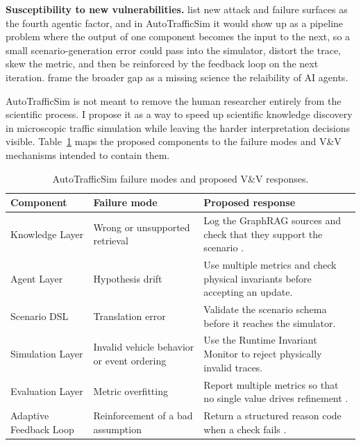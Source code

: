 \begin{bibunit}[plainnat]
\textbf{Susceptibility to new vulnerabilities.}
\citet{koohestani2025agentguard} list new attack and failure surfaces as
the fourth agentic factor, and in AutoTrafficSim it would show up as a
pipeline problem where the output of one component becomes the input to the
next, so a small scenario-generation error could pass into the
simulator, distort the trace, skew the metric, and then be reinforced
by the feedback loop on the next iteration. \citet{rabanser2026towards}
frame the broader gap as a missing science the relaibility of AI agents.

AutoTrafficSim is not meant to remove the human researcher entirely from the
scientific process. I propose it as a way to speed up scientific knowledge
discovery in microscopic traffic simulation while leaving the harder
interpretation decisions visible. Table~\ref{tab:q11-failuremap} maps the
proposed components to the failure modes and V\&V mechanisms intended to
contain them.

\begin{table}[H]
\centering
\renewcommand{\arraystretch}{1.25}
\caption{AutoTrafficSim failure modes and proposed V\&V responses.}
\label{tab:q11-failuremap}
\begin{tabularx}{\textwidth}{
  >{\raggedright\arraybackslash}p{3.0cm}
  >{\raggedright\arraybackslash}p{3.4cm}
  >{\raggedright\arraybackslash}X}
\toprule
\textbf{Component} &
\textbf{Failure mode} &
\textbf{Proposed response} \\
\midrule
Knowledge Layer
& Wrong or unsupported retrieval
& Log the GraphRAG sources and check that they support the scenario
\citep{edge2024local}. \\
\midrule
Agent Layer
& Hypothesis drift
& Use multiple metrics and check physical invariants before accepting an
update. \\
\midrule
Scenario DSL
& Translation error
& Validate the scenario schema before it reaches the simulator. \\
\midrule
Simulation Layer
& Invalid vehicle behavior or event ordering
& Use the Runtime Invariant Monitor to reject physically invalid traces. \\
\midrule
Evaluation Layer
& Metric overfitting
& Report multiple metrics so that no single value drives refinement
\citep{manheim2019categorizing}. \\
\midrule
Adaptive Feedback Loop
& Reinforcement of a bad assumption
& Return a structured reason code when a check fails
\citep{yan2025guiding}. \\
\bottomrule
\end{tabularx}
\end{table}



\end{bibunit}
